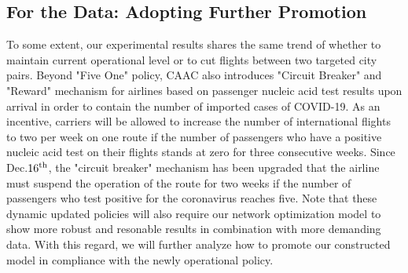 \subsection{For the Data: Adopting Further Promotion}
To some extent, our experimental results shares the same trend of whether to maintain current operational level or to cut flights between two targeted city pairs. Beyond "Five One" policy, CAAC also introduces "Circuit Breaker" and "Reward" mechanism for airlines based on passenger nucleic acid test results upon arrival in order to contain the number of imported cases of COVID-19. As an incentive, carriers will be allowed to increase the number of international flights to two per week on one route if the number of passengers who have a positive nucleic acid test on their flights stands at zero for three consecutive weeks. Since Dec.$16^{\rm th}$, the "circuit breaker" mechanism has been upgraded that the airline must suspend the operation of the route for two weeks if the number of passengers who test positive for the coronavirus reaches five. Note that these dynamic updated policies will also require our network optimization model to show more robust and resonable results in combination with more demanding data. With this regard, we will further analyze how to promote our constructed model in compliance with the newly operational policy.



